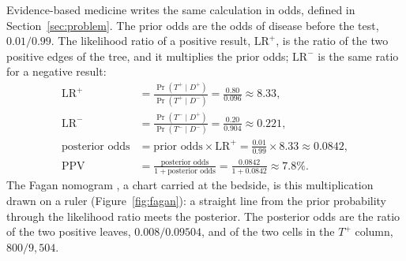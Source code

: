\documentclass[11pt]{article}
\begin{document}
Evidence-based medicine writes the same calculation in odds, defined in Section~\ref{sec:problem}. The prior odds are the odds of disease before the test, $0.01/0.99$. The likelihood ratio of a positive result, $\mathrm{LR}^+$, is the ratio of the two positive edges of the tree, and it multiplies the prior odds; $\mathrm{LR}^-$ is the same ratio for a negative result:
\begin{align*}
  \mathrm{LR}^+ &= \frac{\Pr(T^+ \mid D^+)}{\Pr(T^+ \mid D^-)} = \frac{0.80}{0.096} \approx 8.33, \\
  \mathrm{LR}^- &= \frac{\Pr(T^- \mid D^+)}{\Pr(T^- \mid D^-)} = \frac{0.20}{0.904} \approx 0.221, \\
  \text{posterior odds} &= \text{prior odds} \times \mathrm{LR}^+ = \frac{0.01}{0.99} \times 8.33 \approx 0.0842, \\
  \mathrm{PPV} &= \frac{\text{posterior odds}}{1 + \text{posterior odds}} = \frac{0.0842}{1 + 0.0842} \approx 7.8\%.
\end{align*}
The Fagan nomogram \cite{fagan1975}, a chart carried at the bedside, is this multiplication drawn on a ruler (Figure~\ref{fig:fagan}): a straight line from the prior probability through the likelihood ratio meets the posterior. The posterior odds are the ratio of the two positive leaves, $0.008 / 0.09504$, and of the two cells in the $T^+$ column, $800 / 9{,}504$.
\end{document}
